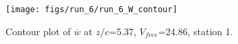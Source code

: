 \begin{figure}[H]
\centering
\texttt{[image: figs/run\_6/run\_6\_W\_contour]}
\caption{Contour plot of $\overline{w}$ at $z/c$=5.37, $V_{free}$=24.86, station 1.}
\label{fig:run_6_W_contour}
\end{figure}


